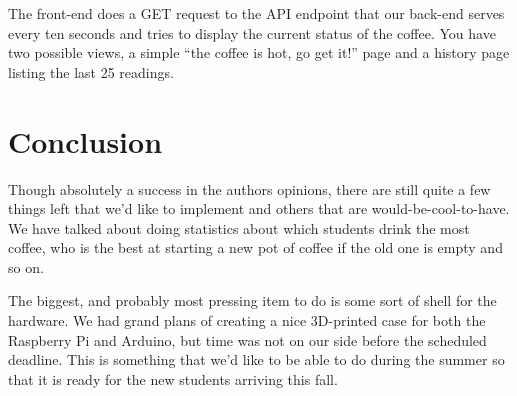 \documentclass[12pt,a4paper,oneside,article]{memoir}
\numberwithin{equation}{chapter}
\begin{document}
The front-end does a GET request to the API endpoint that our back-end serves
every ten seconds and tries to display the current status of the coffee. You
have two possible views, a simple ``the coffee is hot, go get it!'' page and a
history page listing the last 25 readings.

\section{Conclusion}\label{sec:conclusion}
Though absolutely a success in the authors opinions, there are still quite a few
things left that we'd like to implement and others that are
would-be-cool-to-have. We have talked about doing statistics about which
students drink the most coffee, who is the best at starting a new pot of coffee
if the old one is empty and so on.

The biggest, and probably most pressing item to do is some sort of shell for the
hardware. We had grand plans of creating a nice 3D-printed case for both the
Raspberry Pi and Arduino, but time was not on our side before the scheduled
deadline. This is something that we'd like to be able to do during the summer so
that it is ready for the new students arriving this fall.

\clearpage{}
\renewcommand*{\UrlFont}{\footnotesize\ttfamily}
\printbibliography{}
\end{document}

